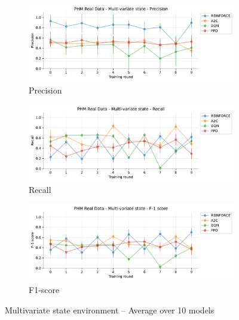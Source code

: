 \documentclass[a4paper, 12pt]{article}
\begin{document}
\begin{appendices}
\begin{figure}[h]
	\begin{subfigure}{\textwidth}
		\centering
		\includegraphics[width=\linewidth]{Multivariate_Pr.pdf}  
		\caption{Precision}
		\label{fig:tr-ms-pr}
	\end{subfigure} \par\smallskip
	
	\begin{subfigure}{\textwidth}
		\centering
		\includegraphics[width=\linewidth]{Multivariate_Rc.pdf}  
		\caption{Recall}
		\label{fig:tr-ms-rc}
	\end{subfigure} \par\smallskip
	
	\begin{subfigure}{\textwidth}
		\centering
		\includegraphics[width=\linewidth]{Multivariate_F1.pdf}  
		\caption{F1-score}
		\label{fig:tr-ms-f1}
	\end{subfigure} \par\smallskip
	\caption{Multivariate state environment -- Average over 10 models}
	\label{fig:tr-ms-env}
\end{figure}


\end{appendices}
\end{document}
